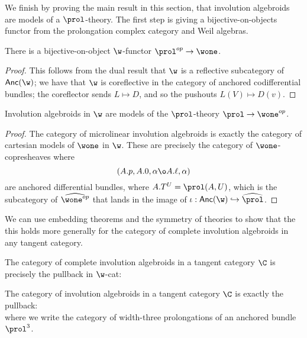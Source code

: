 We finish by proving the main result in this section, that involution algebroids are models of a $\prol$-theory. 
The first step is giving a bijective-on-objects functor from the prolongation complex category and Weil algebras.
\begin{lemma}
	There is a bijective-on-object $\w$-functor ${\prol}^{op} \to \wone$.
\end{lemma}
\begin{proof}
	This follows from the dual result that $\w$ is a reflective subcategory of $\mathsf{Anc}(\w)$; we have that $\w$ is coreflective in the category of anchored codifferential bundles; the coreflector sends $L \mapsto D$, and so the pushouts $L(V) \mapsto D(v)$.
\end{proof}
\begin{proposition}
	Involution algebroids in $\w$ are models of the ${\prol}$-theory ${\prol} \to \wone^{op}$.
\end{proposition}
\begin{proof}
	The category of microlinear involution algebroids is exactly the category of cartesian models of $\wone$ in $\w$. 
	These are precisely the category of $\wone$-copresheaves where 
	\[
		(A.p,A.0, \alpha \o A.\ell, \alpha)
	\]
	are anchored differential bundles, where $A.T^U = \prol(A,U)$, which is the subcategory of $\widehat{\wone^{op}}$ that lands in the image of $\iota: \mathsf{Anc}(\w) \hookrightarrow \widehat\prol$.
\end{proof}
We can use embedding theorems and the symmetry of theories to show that the this holds more generally for the category of complete involution algebroids in any tangent category.
\begin{corollary}
	The category of complete involution algebroids in a tangent category $\C$ is precisely the pullback in $\w$-cat:
	\begin{equation}\label{eq:prol2}
        
	\end{equation}
\end{corollary}
\begin{corollary}
    The category of involution algebroids in a tangent category $\C$ is exactly the pullback:
    \begin{equation}\label{eq:prol3}
        
    \end{equation}
    where we write the category of width-three prolongations of an anchored bundle $\prol^3$.
\end{corollary}
